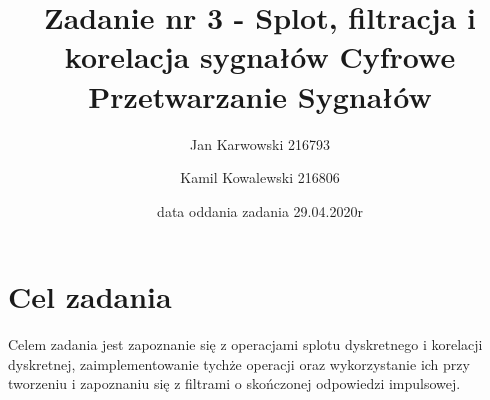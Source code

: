 \documentclass[12pt]{article}
\title{{\bf Zadanie nr 3 - Splot, filtracja i korelacja sygnałów}\linebreak
    Cyfrowe Przetwarzanie Sygnałów}
\author{Jan Karwowski 216793 \and Kamil Kowalewski 216806}
\date{data oddania zadania 29.04.2020r}
\begin{document}
    \clearpage\maketitle
    \thispagestyle{empty}
    \newpage
    \setcounter{page}{1}
    \section{Cel zadania} {
        Celem zadania jest zapoznanie się z operacjami splotu dyskretnego i korelacji
        dyskretnej, zaimplementowanie tychże operacji oraz wykorzystanie ich przy
        tworzeniu i zapoznaniu się z filtrami o skończonej odpowiedzi impulsowej.
    }
\end{document}
